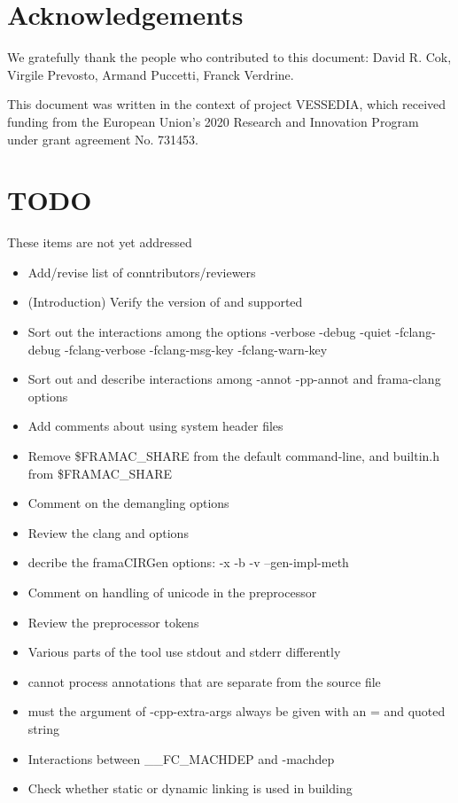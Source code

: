 \documentclass[web]{frama-c-book}
\begin{document}
\section*{Acknowledgements}

We gratefully thank the people who contributed to this document:
David R. Cok, Virgile Prevosto, Armand Puccetti, Franck Verdrine.

This document was written in the context of project VESSEDIA,
which received funding from the European Union's 2020
Research and Innovation Program under grant agreement
No. 731453.













\appendix



\section*{TODO}

These items are not yet addressed
\begin{itemize}
\item Add/revise list of conntributors/reviewers
\item (Introduction) Verify the version of \framac and \clang supported
\item Sort out the interactions among the options -verbose -debug -quiet -fclang-debug -fclang-verbose -fclang-msg-key -fclang-warn-key
\item Sort out and describe interactions among -annot -pp-annot and frama-clang options
\item Add comments about using system header files
\item Remove \$FRAMAC\_SHARE from the default command-line, and builtin.h from \$FRAMAC\_SHARE
\item Comment on the demangling options
\item Review the clang and \irg options
\item decribe the framaCIRGen options: -x -b -v --gen-impl-meth
\item Comment on handling of unicode in the preprocessor
\item Review the preprocessor tokens
\item Various parts of the tool use stdout and stderr differently
\item \fclang cannot process annotations that are separate from the source file
\item must the argument of -cpp-extra-args always be given with an = and quoted string
\item Interactions between \_\_FC\_MACHDEP and -machdep
\item Check whether static or dynamic linking is used in building
\end{itemize}
\end{document}
